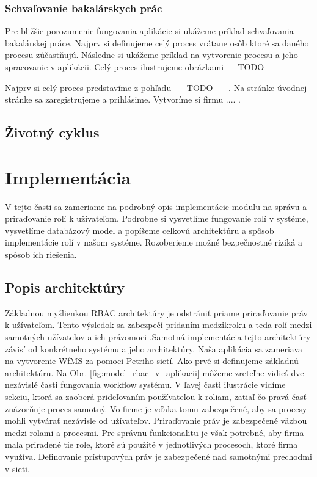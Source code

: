 	\subsubsection{Schvaľovanie bakalárskych prác}
	Pre bližšie porozumenie fungovania aplikácie si ukážeme príklad schvaľovania bakalárskej práce. Najprv si definujeme celý proces vrátane osôb ktoré sa daného procesu zúčastňujú. Následne si ukážeme príklad na vytvorenie procesu a jeho spracovanie v aplikácii. Celý proces ilustrujeme obrázkami 
	----TODO---
	
	Najprv si celý proces predstavíme z pohľadu -----TODO----- . Na stránke úvodnej stránke sa zaregistrujeme a prihlásime. Vytvoríme si firmu .... . 
		
	
	\subsection{Životný cyklus}
	

\section{Implementácia}
V tejto časti sa zameriame na podrobný opis implementácie modulu na správu a priraďovanie rolí k užívateľom. Podrobne si vysvetlíme fungovanie rolí v systéme, vysvetlíme databázový model a popíšeme celkovú architektúru a spôsob implementácie rolí v našom systéme. Rozoberieme možné bezpečnostné riziká a spôsob ich riešenia.

	\subsection{Popis architektúry}
	Základnou myšlienkou RBAC architektúry je odstrániť priame priraďovanie práv k užívateľom. Tento výsledok sa zabezpečí pridaním medzikroku a teda rolí medzi samotných užívateľov a ich právomoci .Samotná implementácia tejto architektúry závisí od konkrétneho systému a jeho architektúry. Naša aplikácia sa zameriava na vytvorenie WfMS za pomoci Petriho sietí. Ako prvé si definujeme základnú architektúru. Na Obr. \ref{fig:model_rbac_v_aplikacii} môžeme zreteľne vidieť dve nezávislé časti fungovania workflow systému. V ľavej časti ilustrácie vidíme sekciu, ktorá sa zaoberá  prideľovaním  používateľou k roliam, zatiaľ čo pravá časť znázorňuje proces samotný. Vo firme je vďaka tomu zabezpečené, aby sa procesy mohli vytvárať nezávisle od užívateľov. Priraďovanie práv je zabezpečené väzbou medzi rolami a procesmi. Pre správnu funkcionalitu je však potrebné, aby firma mala priradené tie role, ktoré sú použité v jednotlivých procesoch, ktoré firma využíva. Definovanie prístupových práv je zabezpečené nad samotnými prechodmi v sieti.
	
